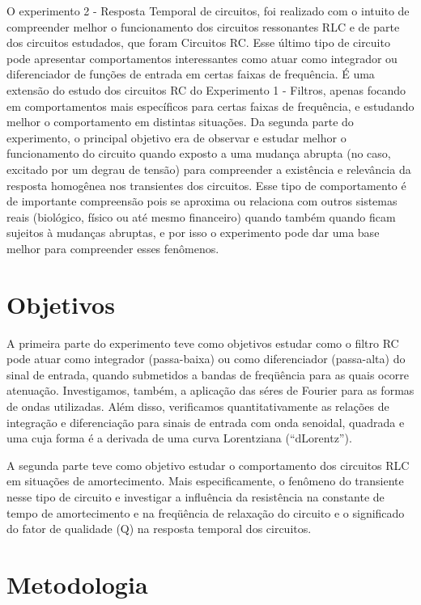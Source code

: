 \documentclass[11pt,a4paper]{article}
\begin{document}
    O experimento 2 - Resposta Temporal de circuitos, foi realizado com o intuito de compreender melhor o funcionamento dos circuitos ressonantes RLC e de parte dos circuitos estudados, que foram Circuitos RC. Esse último tipo de circuito pode apresentar comportamentos interessantes como atuar como integrador ou diferenciador de funções de entrada em certas faixas de frequência. É uma extensão do estudo dos circuitos RC do Experimento 1 - Filtros, apenas focando em comportamentos mais específicos para certas faixas de frequência, e estudando melhor o comportamento em distintas situações.
    Da segunda parte do experimento, o principal objetivo era de observar e estudar melhor o funcionamento do circuito quando exposto a uma mudança abrupta (no caso, excitado por um degrau de tensão) para compreender a existência e relevância da resposta homogênea nos transientes dos circuitos. Esse tipo de comportamento é de importante compreensão pois se aproxima ou relaciona com outros sistemas reais (biológico, físico ou até mesmo financeiro) quando também quando ficam sujeitos à mudanças abruptas, e por isso o experimento pode dar uma base melhor para compreender esses fenômenos.
    
    
\section{Objetivos}
    A primeira parte do experimento teve como objetivos estudar como o filtro RC pode atuar como integrador (passa-baixa) ou como diferenciador (passa-alta) do sinal de entrada, quando submetidos a bandas de freqüência para as quais ocorre atenuação. Investigamos, também, a aplicação das séres de Fourier para as formas de ondas utilizadas. Além disso, verificamos quantitativamente as relações de integração e diferenciação para sinais de entrada com onda senoidal, quadrada e uma cuja forma é a derivada de uma curva Lorentziana (“dLorentz”).
    
    A segunda parte teve como objetivo estudar o comportamento dos circuitos RLC em situações de amortecimento. Mais especificamente, o fenômeno do transiente nesse tipo de circuito e investigar a influência da resistência na constante de tempo de amortecimento e na freqüência de relaxação do circuito e o significado do fator de qualidade (Q) na resposta temporal dos circuitos.
    
    
\section{Metodologia}
\end{document}
